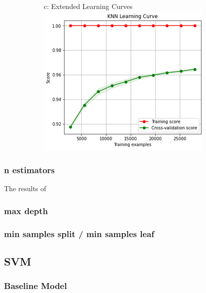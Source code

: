 \documentclass{article}
\begin{document}
\begin{figure}
\begin{subfigure}{.34\textwidth}
	\end{subfigure}
	\begin{subfigure}{.34\textwidth}
		\centering
		c: Extended Learning Curves\\
		\includegraphics[width=\linewidth]{mnist_knn_learning2.png}
		
	\end{subfigure}
	\label{fig:test}
\end{figure}


\subsubsection*{n estimators}
The results of 

\subsubsection*{max depth}

\subsubsection*{min samples split / min samples leaf}

\subsection{SVM}
\subsubsection*{Baseline Model}
\end{document}

